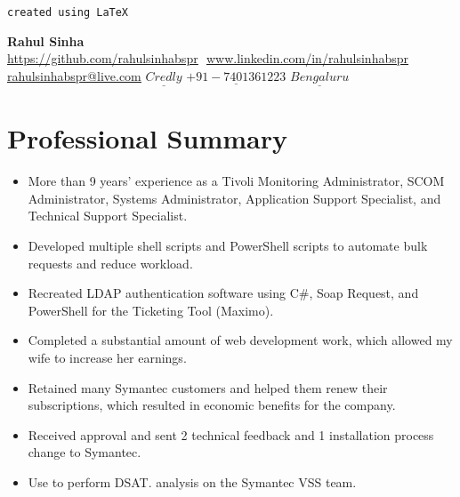 \documentclass[letterpaper, 12 pt]{article}
\begin{document}
		\begin{flushright}
			\texttt{created using {\LaTeX}}
		\end{flushright}
		\vspace*{-1cm}
		\begin{center}
			\textbf{\Huge Rahul Sinha} \\ \vspace{4pt}
			\href{https://github.com/rahulsinhabspr}{\underline{https://github.com/rahulsinhabspr}} $  $
			\href{www.linkedin.com/in/rahulsinhabspr}{\underline{www.linkedin.com/in/rahulsinhabspr}} $  $
			\href{mailto:rahulsinhabspr@live.com}
			{\underline{rahulsinhabspr@live.com}}
			\newline
			\href{https://www.credly.com/users/rahul-sinha.eb04cee7}{$\underline{Credly}$}
			{$\underline{+91-7401361223}$}
			{$\underline{Bengaluru}$}
		\end{center}
		
	\section*{Professional Summary}
			\begin{itemize}[noitemsep]
				\item {More than 9 years' experience as a Tivoli Monitoring Administrator, SCOM Administrator, Systems Administrator, Application Support Specialist, and Technical Support Specialist.}
				\item {Developed multiple shell scripts and PowerShell scripts to automate bulk requests and reduce workload.}
				\item {Recreated LDAP authentication software using C\#, Soap Request, and PowerShell for the Ticketing Tool (Maximo).}
				\item  {Completed a substantial amount of web development work, which allowed my wife to increase her earnings.}
				\item {Retained many Symantec customers and helped them renew their subscriptions, which resulted in economic benefits for the company.}
				\item {Received approval and sent 2 technical feedback and 1 installation process change to Symantec.}
				\item {Use to perform DSAT. analysis on the Symantec VSS team.}				
			\end{itemize}
\end{document}
